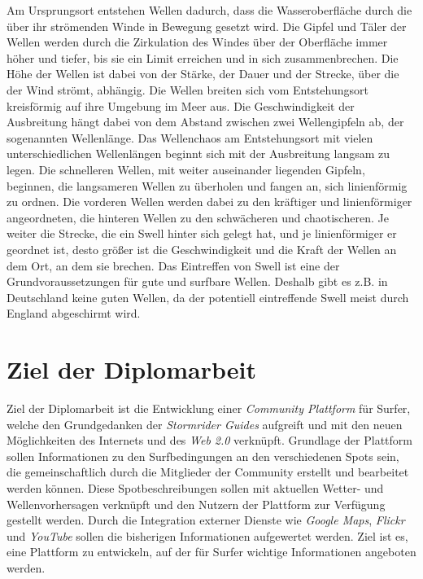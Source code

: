 Am Ursprungsort entstehen Wellen dadurch, dass die Wasseroberfläche
durch die über ihr strömenden Winde in Bewegung gesetzt wird. Die
Gipfel und Täler der Wellen werden durch die Zirkulation des Windes
über der Oberfläche immer höher und tiefer, bis sie ein Limit
erreichen und in sich zusammenbrechen. Die Höhe der Wellen ist dabei
von der Stärke, der Dauer und der Strecke, über die der Wind strömt,
abhängig. Die Wellen breiten sich vom Entstehungsort kreisförmig auf
ihre Umgebung im Meer aus. Die Geschwindigkeit der Ausbreitung hängt
dabei von dem Abstand zwischen zwei Wellengipfeln ab, der sogenannten
Wellenlänge. Das Wellenchaos am Entstehungsort mit vielen
unterschiedlichen Wellenlängen beginnt sich mit der Ausbreitung
langsam zu legen. Die schnelleren Wellen, mit weiter auseinander
liegenden Gipfeln, beginnen, die langsameren Wellen zu überholen und
fangen an, sich linienförmig zu ordnen. Die vorderen Wellen werden
dabei zu den kräftiger und linienförmiger angeordneten, die hinteren
Wellen zu den schwächeren und chaotischeren. Je weiter die Strecke,
die ein Swell hinter sich gelegt hat, und je linienförmiger er
geordnet ist, desto größer ist die Geschwindigkeit und die Kraft der
Wellen an dem Ort, an dem sie brechen. Das Eintreffen von Swell ist
eine der Grundvoraussetzungen für gute und surfbare Wellen. Deshalb
gibt es z.B. in Deutschland keine guten Wellen, da der potentiell
eintreffende Swell meist durch England abgeschirmt wird.

\section{Ziel der Diplomarbeit}
Ziel der Diplomarbeit ist die Entwicklung einer \textit{Community
  Plattform} für Surfer, welche den Grundgedanken der
\textit{Stormrider Guides} aufgreift und mit den neuen Möglichkeiten
des Internets und des \textit{Web 2.0} verknüpft. Grundlage der
Plattform sollen Informationen zu den Surfbedingungen an den
verschiedenen Spots sein, die gemeinschaftlich durch die Mitglieder
der Community erstellt und bearbeitet werden können. Diese
Spotbeschreibungen sollen mit aktuellen Wetter- und Wellenvorhersagen
verknüpft und den Nutzern der Plattform zur Verfügung gestellt
werden. Durch die Integration externer Dienste wie \textit{Google
  Maps}, \textit{Flickr} und \textit{YouTube} sollen die bisherigen
Informationen aufgewertet werden. Ziel ist es, eine Plattform zu
entwickeln, auf der für Surfer wichtige Informationen angeboten
werden.

